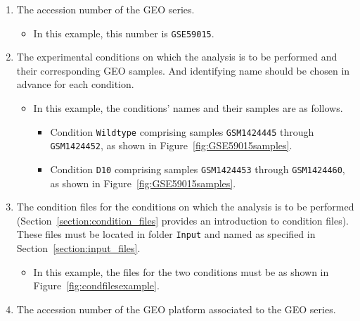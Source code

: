 \documentclass[final,letterpaper,12pt]{article}
\begin{document}
\begin{enumerate}

\item The accession number of the GEO series.

\begin{itemize}

\item In this example, this number is \texttt{GSE59015}.

\end{itemize}


\item The experimental conditions on which the analysis is to be performed and their corresponding GEO samples. And identifying name should be chosen in advance for each condition.

\begin{itemize}

\item In this example, the conditions' names and their samples are as follows.

\begin{itemize}

\item Condition \texttt{Wildtype} comprising samples \texttt{GSM1424445} through \texttt{GSM1424452}, as shown in Figure~\ref{fig:GSE59015samples}.

\item Condition \texttt{D10} comprising samples \texttt{GSM1424453} through \texttt{GSM1424460}, as shown in Figure~\ref{fig:GSE59015samples}.

\end{itemize}
\end{itemize}
\item The condition files for the conditions on which the analysis is to be performed  (Section~\ref{section:condition_files} provides an introduction to condition files). These files must be located in folder \texttt{Input} and named as specified in Section~\ref{section:input_files}.

\begin{itemize}

\item In this example, the files for the two conditions must be as shown in Figure~\ref{fig:condfilesexample}.
\end{itemize}

\item The accession number of the GEO platform associated to the GEO series.


\end{enumerate}
\end{document}
